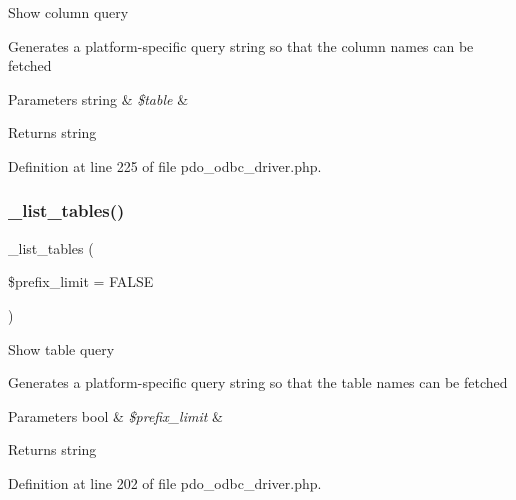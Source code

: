Show column query

Generates a platform-\/specific query string so that the column names can be fetched


\begin{DoxyParams}[1]{Parameters}
string & {\em \$table} & \\
\hline
\end{DoxyParams}
\begin{DoxyReturn}{Returns}
string 
\end{DoxyReturn}


Definition at line 225 of file pdo\+\_\+odbc\+\_\+driver.\+php.

\mbox{\label{class_c_i___d_b__pdo__odbc__driver_a435c0f3ce54fe7daa178baa8532ebd54}} 
\subsubsection{\texorpdfstring{\_list\_tables()}{\_list\_tables()}}
{\footnotesize\ttfamily \+\_\+list\+\_\+tables (\begin{DoxyParamCaption}\item[{}]{\$prefix\+\_\+limit = {\ttfamily FALSE} }\end{DoxyParamCaption})\hspace{0.3cm}{\ttfamily [protected]}}

Show table query

Generates a platform-\/specific query string so that the table names can be fetched


\begin{DoxyParams}[1]{Parameters}
bool & {\em \$prefix\+\_\+limit} & \\
\hline
\end{DoxyParams}
\begin{DoxyReturn}{Returns}
string 
\end{DoxyReturn}


Definition at line 202 of file pdo\+\_\+odbc\+\_\+driver.\+php.

\mbox{\label{class_c_i___d_b__pdo__odbc__driver_af435df5703c238769d6d16fde6d51182}} 
